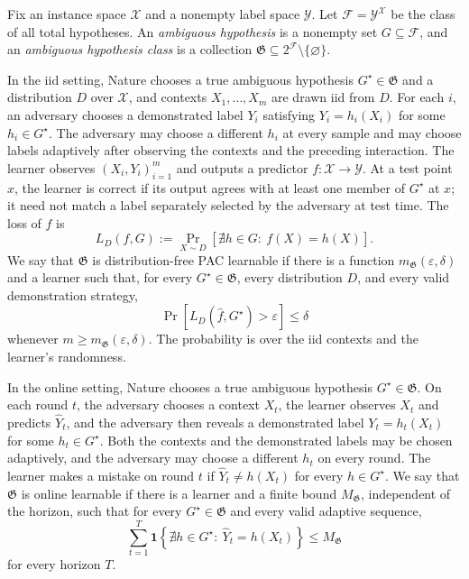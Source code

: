 \documentclass[11pt]{article}
\theoremstyle{remark}
\begin{document}
Fix an instance space $\mathcal{X}$ and a nonempty label space $\mathcal{Y}$. Let $\mathcal{F}=\mathcal{Y}^{\mathcal{X}}$ be the class of all total hypotheses. An \emph{ambiguous hypothesis} is a nonempty set $G\subseteq\mathcal{F}$, and an \emph{ambiguous hypothesis class} is a collection $\mathfrak{G}\subseteq 2^{\mathcal{F}}\setminus\{\varnothing\}$.

In the iid setting, Nature chooses a true ambiguous hypothesis $G^\star\in\mathfrak{G}$ and a distribution $D$ over $\mathcal{X}$, and contexts $X_1,\ldots,X_m$ are drawn iid from $D$. For each $i$, an adversary chooses a demonstrated label $Y_i$ satisfying $Y_i=h_i(X_i)$ for some $h_i\in G^\star$. The adversary may choose a different $h_i$ at every sample and may choose labels adaptively after observing the contexts and the preceding interaction. The learner observes $(X_i,Y_i)_{i=1}^m$ and outputs a predictor $f:\mathcal{X}\to\mathcal{Y}$. At a test point $x$, the learner is correct if its output agrees with at least one member of $G^\star$ at $x$; it need not match a label separately selected by the adversary at test time. The loss of $f$ is
\[
    L_D(f,G)
    :=
    \Pr_{X\sim D}\!\left[\nexists h\in G:\ f(X)=h(X)\right].
\]
We say that $\mathfrak{G}$ is distribution-free PAC learnable if there is a function $m_{\mathfrak{G}}(\varepsilon,\delta)$ and a learner such that, for every $G^\star\in\mathfrak{G}$, every distribution $D$, and every valid demonstration strategy,
\[
    \Pr\!\left[L_D(\widehat{f},G^\star)>\varepsilon\right]
    \leq\delta
\]
whenever $m\geq m_{\mathfrak{G}}(\varepsilon,\delta)$. The probability is over the iid contexts and the learner's randomness.

In the online setting, Nature chooses a true ambiguous hypothesis $G^\star\in\mathfrak{G}$. On each round $t$, the adversary chooses a context $X_t$, the learner observes $X_t$ and predicts $\widehat{Y}_t$, and the adversary then reveals a demonstrated label $Y_t=h_t(X_t)$ for some $h_t\in G^\star$. Both the contexts and the demonstrated labels may be chosen adaptively, and the adversary may choose a different $h_t$ on every round. The learner makes a mistake on round $t$ if $\widehat{Y}_t\neq h(X_t)$ for every $h\in G^\star$. We say that $\mathfrak{G}$ is online learnable if there is a learner and a finite bound $M_{\mathfrak{G}}$, independent of the horizon, such that for every $G^\star\in\mathfrak{G}$ and every valid adaptive sequence,
\[
    \sum_{t=1}^T \mathbf{1}\!\left\{\nexists h\in G^\star:\ \widehat{Y}_t=h(X_t)\right\}
    \leq M_{\mathfrak{G}}
\]
for every horizon $T$.
\end{document}
